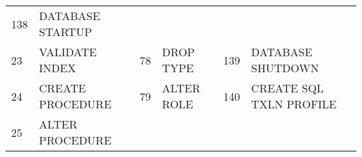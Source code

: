 \begin{longtable}[]{@{}llllll@{}}
\begin{minipage}[t]{0.06\columnwidth}
138\strut
\end{minipage} & \begin{minipage}[t]{0.24\columnwidth}\raggedright\strut
DATABASE STARTUP\strut
\end{minipage}\tabularnewline
\begin{minipage}[t]{0.06\columnwidth}\raggedright\strut
23\strut
\end{minipage} & \begin{minipage}[t]{0.19\columnwidth}\raggedright\strut
VALIDATE INDEX\strut
\end{minipage} & \begin{minipage}[t]{0.06\columnwidth}\raggedright\strut
78\strut
\end{minipage} & \begin{minipage}[t]{0.24\columnwidth}\raggedright\strut
DROP TYPE\strut
\end{minipage} & \begin{minipage}[t]{0.06\columnwidth}\raggedright\strut
139\strut
\end{minipage} & \begin{minipage}[t]{0.24\columnwidth}\raggedright\strut
DATABASE SHUTDOWN\strut
\end{minipage}\tabularnewline
\begin{minipage}[t]{0.06\columnwidth}\raggedright\strut
24\strut
\end{minipage} & \begin{minipage}[t]{0.19\columnwidth}\raggedright\strut
CREATE PROCEDURE\strut
\end{minipage} & \begin{minipage}[t]{0.06\columnwidth}\raggedright\strut
79\strut
\end{minipage} & \begin{minipage}[t]{0.24\columnwidth}\raggedright\strut
ALTER ROLE\strut
\end{minipage} & \begin{minipage}[t]{0.06\columnwidth}\raggedright\strut
140\strut
\end{minipage} & \begin{minipage}[t]{0.24\columnwidth}\raggedright\strut
CREATE SQL TXLN PROFILE\strut
\end{minipage}\tabularnewline
\begin{minipage}[t]{0.06\columnwidth}\raggedright\strut
25\strut
\end{minipage} & \begin{minipage}[t]{0.19\columnwidth}\raggedright\strut
ALTER PROCEDURE\strut
\end{minipage} & \begin{minipage}[t]{0.06\columnwidth}\raggedright\strut

\end{minipage}
\end{longtable}
